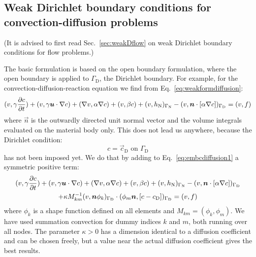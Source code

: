 \subsection{Weak Dirichlet boundary conditions for convection-diffusion
            problems}
\label{sec:weakDdiffusion}

(It is advised to first read Sec.~\ref{sec:weakDflow} on weak Dirichlet
boundary conditions for flow problems.)

The basic formulation is based on the open boundary formulation, where the open
boundary is applied to $\Gamma_\text{D}$, the Dirichlet boundary. For example, for
the convection-diffusion-reaction equation we find from
Eq.~\eqref{eq:weakformdiffusion}:
\begin{equation}
   (v,\gamma\dfrac{\partial c}{\partial t})+(v,\gamma \boldsymbol{u}\cdot\nabla c)
   +(\nabla v,\alpha\nabla c) + (v,\beta c)
             + (v,h_{\text{N}})_{\Gamma_{\text{N}}}
            -(v,\boldsymbol{n}\cdot[\alpha\nabla c])_{\Gamma_{\text{D}}}
              =(v,f)
   \label{eq:embcdiffusion1}
\end{equation}
where $\vec n$ is the outwardly directed unit normal vector and 
the volume integrals evaluated on the material body only. This does not lead us
anywhere, because the Dirichlet condition:
\begin{equation}
    c = \vec c_\text{D}\text{ on }\Gamma_\text{D}
\end{equation}
has not been imposed yet. We do that by adding to 
Eq.~\eqref{eq:embcdiffusion1} a symmetric positive term:
\begin{multline}
   (v,\gamma\dfrac{\partial c}{\partial t})+(v,\gamma \boldsymbol{u}\cdot\nabla c)
   +(\nabla v,\alpha\nabla c) + (v,\beta c) +
             (v,h_{\text{N}})_{\Gamma_{\text{N}}}
            -(v,\boldsymbol{n}\cdot[\alpha\nabla c])_{\Gamma_{\text{D}}}\\
 +\kappa M_{km}^{-1}(v,\boldsymbol{n}\phi_k)_{\Gamma_\text{D}}\cdot(\phi_m\boldsymbol{n}, [c-
         c_\text{D}])_{\Gamma_\text{D}} =(v,f)
\label{eq:embcdiffusion2}
\end{multline}
where $\phi_k$ is a shape function defined on all elements and
$M_{km}=(\phi_k,\phi_m)$. 
We have used summation convection for dummy indices $k$ and $m$,
both running over all nodes.
The parameter $\kappa>0$ has a dimension
identical to a diffusion coefficient and can be chosen freely, but a value
near the actual
diffusion coefficient gives the best results.

